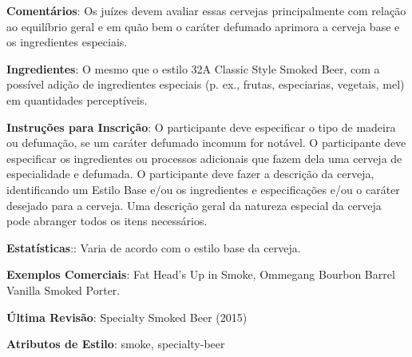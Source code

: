 \textbf{Comentários}: Os juízes devem avaliar essas cervejas principalmente com relação ao equilíbrio geral e em quão bem o caráter defumado aprimora a cerveja base e os ingredientes especiais.

\textbf{Ingredientes}: O mesmo que o estilo 32A Classic Style Smoked Beer, com a possível adição de ingredientes especiais (p. ex., frutas, especiarias, vegetais, mel) em quantidades perceptíveis.

\textbf{Instruções para Inscrição}: O participante deve especificar o tipo de madeira ou defumação, se um caráter defumado incomum for notável. O participante deve especificar os ingredientes ou processos adicionais que fazem dela uma cerveja de especialidade e defumada. O participante deve fazer a descrição da cerveja, identificando um Estilo Base e/ou os ingredientes e especificações e/ou o caráter desejado para a cerveja. Uma descrição geral da natureza especial da cerveja pode abranger todos os itens necessários.

\textbf{Estatísticas}:: Varia de acordo com o estilo base da cerveja.

\textbf{Exemplos Comerciais}: Fat Head’s Up in Smoke, Ommegang Bourbon Barrel Vanilla Smoked Porter.

\textbf{Última Revisão}: Specialty Smoked Beer (2015)

\textbf{Atributos de Estilo}: smoke, specialty-beer

